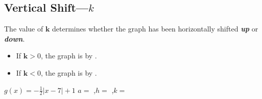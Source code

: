 \subsection{Vertical Shift---$k$}

The value of $\bm{k}$ determines whether the graph 
has been horizontally shifted {\bfseries\itshape up} or {\bfseries\itshape down}.
\begin{itemize}[topsep=-0.5\parskip]
    \item If $\bm{k}>0$, the graph is   by .
    \item If $\bm{k}<0$, the graph is   by .
\end{itemize}



{
    $g(x) = -\frac{1}{2}|x-7| + 1$
    \tcblower
    ${a} =$ ,\quad ${h} =$ ,\quad ${k} =$ 
    \vspace{1.25in}
}
